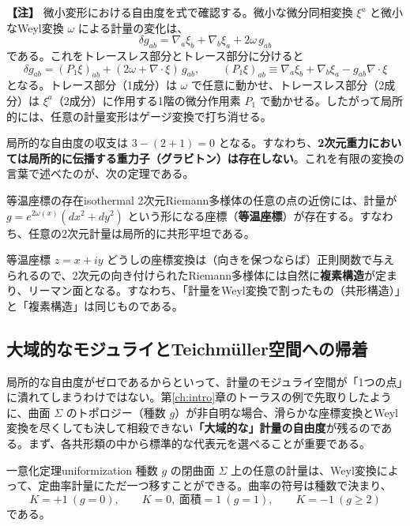 \documentclass[uplatex, dvipdfmx, book]{jsbook}
\let\origsubsection\subsection
\let\origsubsubsection\subsubsection
\renewcommand{\section}{\origsubsection}
\renewcommand{\subsection}{\origsubsubsection}
\renewcommand{\subsubsection}{\paragraph}
\newenvironment{note}{\vspace{1ex}\par\footnotesize\noindent\textbf{【注】}}{\par\vspace{1ex}}
\begin{document}
\begin{note}
微小変形における自由度を式で確認する。微小な微分同相変換 $\xi^a$ と微小なWeyl変換 $\omega$ による計量の変化は、
\begin{equation*}
    \delta g_{ab} = \nabla_a \xi_b + \nabla_b \xi_a + 2\omega\, g_{ab}
\end{equation*}
である。これをトレースレス部分とトレース部分に分けると
\begin{equation*}
    \delta g_{ab} = (P_1\xi)_{ab} + (2\omega + \nabla\cdot\xi)\, g_{ab}, \qquad (P_1\xi)_{ab} \equiv \nabla_a\xi_b + \nabla_b\xi_a - g_{ab}\nabla\cdot\xi
\end{equation*}
となる。トレース部分（1成分）は $\omega$ で任意に動かせ、トレースレス部分（2成分）は $\xi^a$（2成分）に作用する1階の微分作用素 $P_1$ で動かせる。したがって局所的には、任意の計量変形はゲージ変換で打ち消せる。
\end{note}

局所的な自由度の収支は $3 - (2 + 1) = 0$ となる。すなわち、\textbf{2次元重力においては局所的に伝播する重力子（グラビトン）は存在しない}。これを有限の変換の言葉で述べたのが、次の定理である。

\begin{mythm}{等温座標の存在}{isothermal}
2次元Riemann多様体の任意の点の近傍には、計量が $g = e^{2\omega(x)}(dx^2 + dy^2)$ という形になる座標（\textbf{等温座標}）が存在する。すなわち、任意の2次元計量は局所的に共形平坦である。
\end{mythm}

等温座標 $z = x + iy$ どうしの座標変換は（向きを保つならば）正則関数で与えられるので、2次元の向き付けられたRiemann多様体には自然に\textbf{複素構造}が定まり、リーマン面となる。すなわち、「計量をWeyl変換で割ったもの（共形構造）」と「複素構造」は同じものである。

\section{大域的なモジュライとTeichm\"uller空間への帰着}

局所的な自由度がゼロであるからといって、計量のモジュライ空間が「1つの点」に潰れてしまうわけではない。第\ref{ch:intro}章のトーラスの例で先取りしたように、曲面 $\Sigma$ のトポロジー（種数 $g$）が非自明な場合、滑らかな座標変換とWeyl変換を尽くしても決して相殺できない\textbf{「大域的な」計量の自由度}が残るのである。まず、各共形類の中から標準的な代表元を選べることが重要である。

\begin{mythm}{一意化定理}{uniformization}
種数 $g$ の閉曲面 $\Sigma$ 上の任意の計量は、Weyl変換によって、定曲率計量にただ一つ移すことができる。曲率の符号は種数で決まり、
\begin{equation*}
    K = +1\ (g = 0), \qquad K = 0,\ \text{面積} = 1\ (g = 1), \qquad K = -1\ (g \ge 2)
\end{equation*}
である。
\end{mythm}
\end{document}
